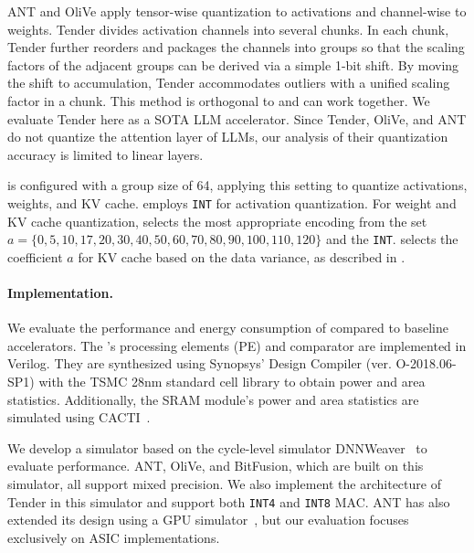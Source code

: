 ANT and OliVe apply tensor-wise quantization to activations and channel-wise to weights.
Tender divides activation channels into several chunks. 
In each chunk, Tender further reorders and packages the channels into groups so that the scaling factors of the adjacent groups can be derived via a simple 1-bit shift. 
By moving the shift to accumulation, Tender accommodates outliers with a unified scaling factor in a chunk.
This method is orthogonal to \proj{} and can work together. 
We evaluate Tender here as a SOTA LLM accelerator.
Since Tender, OliVe, and ANT do not quantize the attention layer of LLMs, our analysis of their quantization accuracy is limited to linear layers.


\proj is configured with a group size of 64, applying this setting to quantize activations, weights, and KV cache.
\proj employs \texttt{INT} for activation quantization.
For weight and KV cache quantization, \proj selects the most appropriate encoding from the set $a = \{0, 5, 10, 17, 20, 30, 40, 50, 60, 70, 80, 90, 100, 110, 120\}$ and the \texttt{INT}.
\proj selects the coefficient $a$ for KV cache based on the data variance, as described in .


\paragraph{Implementation. }
We evaluate the performance and energy consumption of \proj compared to baseline accelerators.
The \proj's processing elements (PE) and comparator are implemented in Verilog.
They are synthesized using Synopsys' Design Compiler (ver. O-2018.06-SP1) with the TSMC 28nm standard cell library to obtain power and area statistics.
Additionally, the SRAM module's power and area statistics are simulated using CACTI~\cite{muralimanohar2009cacti}.

We develop a simulator based on the cycle-level simulator DNNWeaver~\cite{sharma2016high} to evaluate performance.
ANT, OliVe, and BitFusion, which are built on this simulator, all support mixed precision.
We also implement the architecture of Tender in this simulator and support both \texttt{INT4} and \texttt{INT8} MAC.
ANT has also extended its design using a GPU simulator~\cite{gpgpu-sim2009,leng2013gpuwattch,gpgpu-sim4.0}, but our evaluation focuses exclusively on ASIC implementations.



